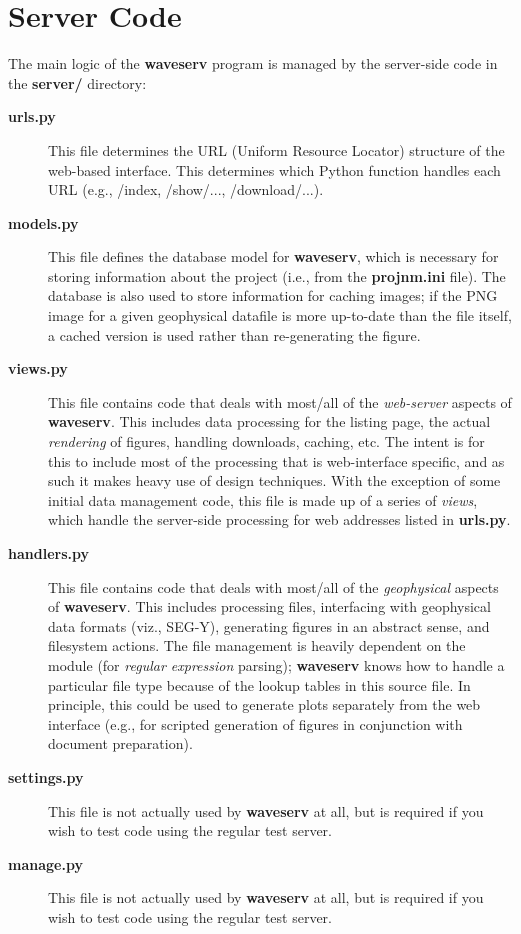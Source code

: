 \documentclass[letterpaper,10pt,english]{sphinxmanual}
\begin{document}
\section{Server Code}
\label{development:server-code}
The main logic of the \textbf{waveserv} program is managed by the server-side code in the \textbf{server/} directory:
\begin{description}
\item[{\textbf{urls.py}}] \leavevmode
This file determines the URL (Uniform Resource Locator) structure of the web-based interface.  This determines which Python function handles each URL (e.g., /index, /show/..., /download/...).

\item[{\textbf{models.py}}] \leavevmode
This file defines the database model for \textbf{waveserv}, which is necessary for storing information about the project (i.e., from the \textbf{projnm.ini} file).  The database is also used to store information for caching images; if the PNG image for a given geophysical datafile is more up-to-date than the file itself, a cached version is used rather than re-generating the figure.

\item[{\textbf{views.py}}] \leavevmode
This file contains code that deals with most/all of the \emph{web-server} aspects of \textbf{waveserv}.  This includes data processing for the listing page, the actual \emph{rendering} of figures, handling downloads, caching, etc.  The intent is for this to include most of the processing that is web-interface specific, and as such it makes heavy use of  design techniques.  With the exception of some initial data management code, this file is made up of a series of \emph{views}, which handle the server-side processing for web addresses listed in \textbf{urls.py}.

\item[{\textbf{handlers.py}}] \leavevmode
This file contains code that deals with most/all of the \emph{geophysical} aspects of \textbf{waveserv}.  This includes processing files, interfacing with geophysical data formats (viz., SEG-Y), generating figures in an abstract sense, and filesystem actions.  The file management is heavily dependent on the \href{http://docs.python.org/library/re.html\#re}{} module (for \emph{regular expression} parsing); \textbf{waveserv} knows how to handle a particular file type because of the lookup tables in this source file.  In principle, this could be used to generate plots separately from the web interface (e.g., for scripted generation of figures in conjunction with document preparation).

\item[{\textbf{settings.py}}] \leavevmode
This file is not actually used by \textbf{waveserv} at all, but is required if you wish to test code using the regular  test server.

\item[{\textbf{manage.py}}] \leavevmode
This file is not actually used by \textbf{waveserv} at all, but is required if you wish to test code using the regular  test server.

\end{description}
\end{document}
